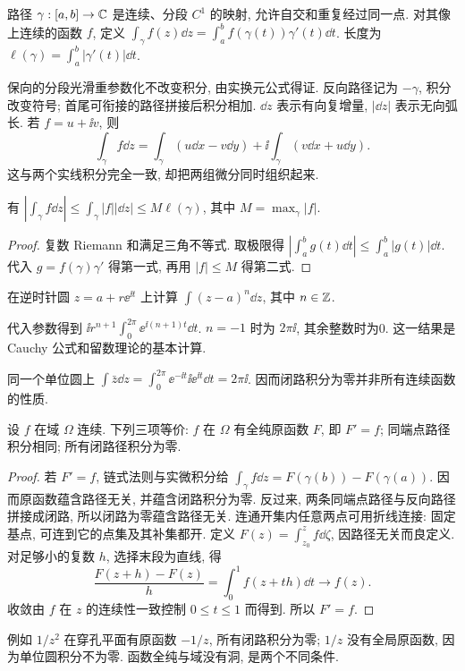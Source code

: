 \begin{definition}
路径 $\gamma:[a,b]\to\mathbb C$ 是连续、分段 $C^1$ 的映射, 允许自交和重复经过同一点. 对其像上连续的函数 $f$, 定义 $\int_\gamma f(z)\dd z=\int_a^b f(\gamma(t))\gamma'(t)\dd t$. 长度为 $\ell(\gamma)=\int_a^b|\gamma'(t)|\dd t$.
\end{definition}
保向的分段光滑重参数化不改变积分, 由实换元公式得证. 反向路径记为 $-\gamma$, 积分改变符号; 首尾可衔接的路径拼接后积分相加. $\dd z$ 表示有向复增量, $|\dd z|$ 表示无向弧长. 若 $f=u+\ii v$, 则
\[
\int_\gamma f\dd z=\int_\gamma(u\dd x-v\dd y)+\ii\int_\gamma(v\dd x+u\dd y).
\]
这与两个实线积分完全一致, 却把两组微分同时组织起来.
\begin{proposition}[积分估计]\label{prop:ml}
有 $|\int_\gamma f\dd z|\le\int_\gamma|f||\dd z|\le M\ell(\gamma)$, 其中 $M=\max_\gamma|f|$.
\end{proposition}
\begin{proof}
复数 Riemann 和满足三角不等式. 取极限得 $|\int_a^b g(t)\dd t|\le\int_a^b|g(t)|\dd t$. 代入 $g=f(\gamma)\gamma'$ 得第一式, 再用 $|f|\le M$ 得第二式.
\end{proof}
\begin{example}
在逆时针圆 $z=a+r\ee^{\ii t}$ 上计算 $\int(z-a)^n\dd z$, 其中 $n\in\mathbb Z$.
\end{example}
\begin{solution}
代入参数得到 $\ii r^{n+1}\int_0^{2\pi}\ee^{\ii(n+1)t}\dd t$. $n=-1$ 时为 $2\pi\ii$, 其余整数时为0. 这一结果是 Cauchy 公式和留数理论的基本计算.
\end{solution}
同一个单位圆上 $\int\bar z\dd z=\int_0^{2\pi}\ee^{-\ii t}\ii\ee^{\ii t}\dd t=2\pi\ii$. 因而闭路积分为零并非所有连续函数的性质.

\begin{theorem}
设 $f$ 在域 $\Omega$ 连续. 下列三项等价: $f$ 在 $\Omega$ 有全纯原函数 $F$, 即 $F'=f$; 同端点路径积分相同; 所有闭路径积分为零.
\end{theorem}
\begin{proof}
若 $F'=f$, 链式法则与实微积分给 $\int_\gamma f\dd z=F(\gamma(b))-F(\gamma(a))$. 因而原函数蕴含路径无关, 并蕴含闭路积分为零. 反过来, 两条同端点路径与反向路径拼接成闭路, 所以闭路为零蕴含路径无关. 连通开集内任意两点可用折线连接: 固定基点, 可连到它的点集及其补集都开. 定义 $F(z)=\int_{z_0}^z f\dd\zeta$, 因路径无关而良定义. 对足够小的复数 $h$, 选择末段为直线, 得
\[
\frac{F(z+h)-F(z)}h=\int_0^1 f(z+th)\dd t\longrightarrow f(z).
\]
收敛由 $f$ 在 $z$ 的连续性一致控制 $0\le t\le1$ 而得到. 所以 $F'=f$.
\end{proof}
例如 $1/z^2$ 在穿孔平面有原函数 $-1/z$, 所有闭路积分为零; $1/z$ 没有全局原函数, 因为单位圆积分不为零. 函数全纯与域没有洞, 是两个不同条件.

